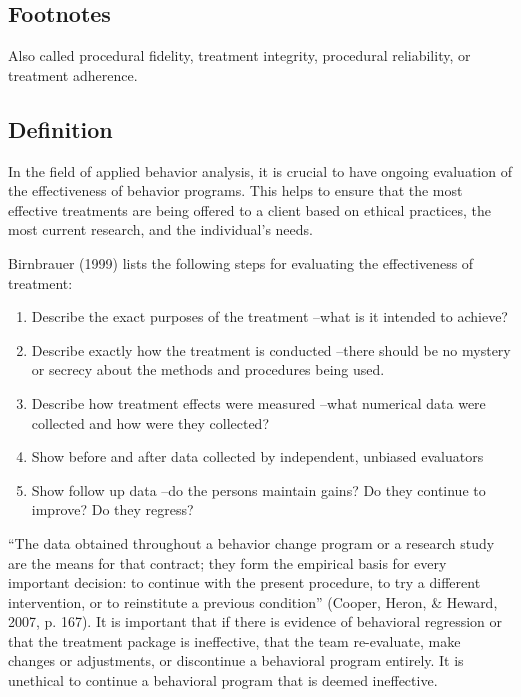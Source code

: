 \subsection{Footnotes}
Also called procedural fidelity, treatment integrity, procedural reliability, or treatment adherence.
%
\subsection{Definition}
In the field of applied behavior analysis, it is crucial to have ongoing evaluation of the effectiveness of behavior programs.  This helps to ensure that the most effective treatments are being offered to a client based on ethical practices, the most current research, and the individual's needs.  

Birnbrauer (1999) lists the following steps for evaluating the effectiveness of treatment:
\begin{enumerate}
\item Describe the exact purposes of the treatment –what is it intended to achieve? 
\item Describe exactly how the treatment is conducted –there should be no mystery or secrecy about the methods and procedures being used. 
\item Describe how treatment effects were measured –what numerical data were collected and how were they collected? 
\item Show before and after data collected by independent, unbiased evaluators
\item Show follow up data –do the persons maintain gains? Do they continue to improve? Do they regress? 
\end{enumerate}

``The data obtained throughout a behavior change program or a research study are the means for that contract; they form the empirical basis for every important decision: to continue with the present procedure, to try a different intervention, or to reinstitute a previous condition'' (Cooper, Heron, \& Heward, 2007, p. 167).  It is important that if there is evidence of behavioral regression or that the treatment package is ineffective, that the team re-evaluate, make changes or adjustments, or discontinue a behavioral program entirely.  It is unethical to continue a behavioral program that is deemed ineffective. 
%
